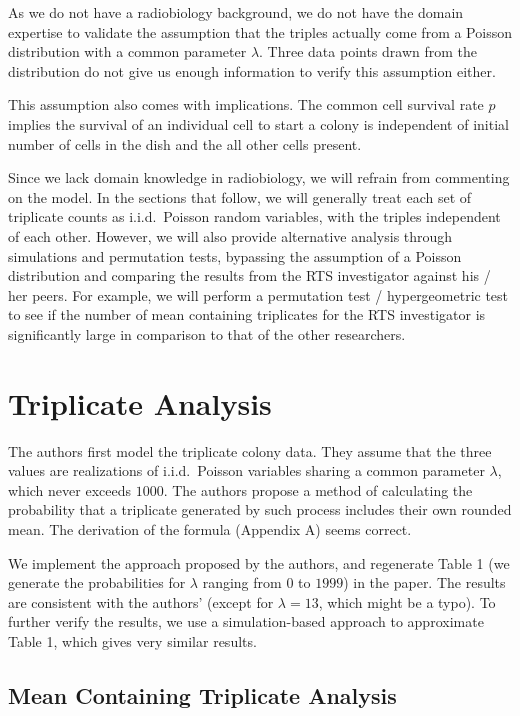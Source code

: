 \documentclass[11pt]{article}
\begin{document}
As we do not have a radiobiology background, we do not have the domain expertise to validate the assumption that the triples actually come from a Poisson distribution with a common parameter $\lambda$. Three data points drawn from the distribution do not give us enough information to verify this assumption either.

This assumption also comes with implications. The common cell survival rate $p$ implies the survival of an individual cell to start a colony is independent of initial number of cells in the dish and the all other cells present.

Since we lack domain knowledge in radiobiology, we will refrain from commenting on the model. In the sections that follow, we will generally treat each set of triplicate counts as i.i.d.\ Poisson random variables, with the triples independent of each other. However, we will also provide alternative analysis through simulations and permutation tests, bypassing the assumption of a Poisson distribution and comparing the results from the RTS investigator against his / her peers. For example, we will perform a permutation test / hypergeometric test to see if the number of mean containing triplicates for the RTS investigator is significantly large in comparison to that of the other researchers.

\section{Triplicate Analysis}

The authors first model the triplicate colony data. They assume that the three values are realizations of i.i.d.\ Poisson variables sharing a common parameter $\lambda$, which never exceeds $1000$. The authors propose a method of calculating the probability that a triplicate generated by such process includes their own rounded mean. The derivation of the formula (Appendix A) seems correct.

We implement the approach proposed by the authors, and regenerate Table 1 (we generate the probabilities for $\lambda$ ranging from $0$ to $1999$) in the paper. The results are consistent with the authors' (except for $\lambda = 13$, which might be a typo). To further verify the results, we use a simulation-based approach to approximate Table 1, which gives very similar results. 

\subsection{Mean Containing Triplicate Analysis}
\end{document}

